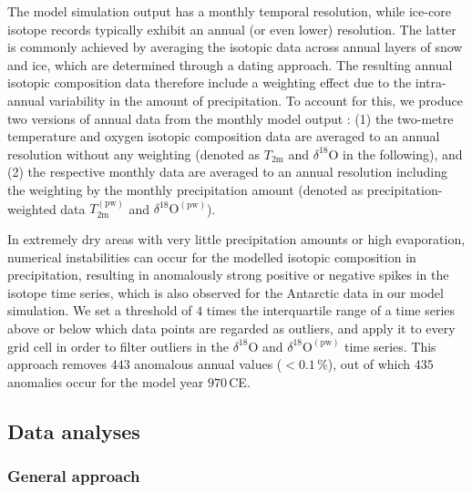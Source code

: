 \documentclass[cp, manuscript]{copernicus}
\begin{document}
The model simulation output has a monthly temporal resolution, while ice-core
isotope records typically exhibit an annual (or even lower) resolution. The
latter is commonly achieved by averaging the isotopic data across annual layers
of snow and ice, which are determined through a dating approach. The resulting
annual isotopic composition data therefore include a weighting effect due to the
intra-annual variability in the amount of precipitation. To account for this, we
produce two versions of annual data from the monthly model output
\citep{Munch2020}: (1) the two-metre temperature and oxygen isotopic composition
data are averaged to an annual resolution without any weighting (denoted as
$T_{2\mathrm{m}}$ and $\delta^{18}\mathrm{O}$ in the following), and (2) the
respective monthly data are averaged to an annual resolution including the
weighting by the monthly precipitation amount (denoted as precipitation-weighted
data $T_{2\mathrm{m}}^{\mathrm{(pw)}}$ and
$\delta^{18}\mathrm{O}^{\mathrm{(pw)}}$).

In extremely dry areas with very little precipitation amounts or high
evaporation, numerical instabilities can occur for the modelled isotopic
composition in precipitation, resulting in anomalously strong positive or
negative spikes in the isotope time series, which is also observed for the
Antarctic data in our model simulation. We set a threshold of $4$ times the
interquartile range of a time series above or below which data points are
regarded as outliers, and apply it to every grid cell in order to filter
outliers in the $\delta^{18}\mathrm{O}$ and
$\delta^{18}\mathrm{O}^{\mathrm{(pw)}}$ time series. This approach removes $443$
anomalous annual values ($<0.1$\,\%), out of which $435$ anomalies occur for the
model year $970$\,CE.

\subsection{Data analyses}\label{methods:main}

\subsubsection{General approach}\label{methods:general}
\end{document}
